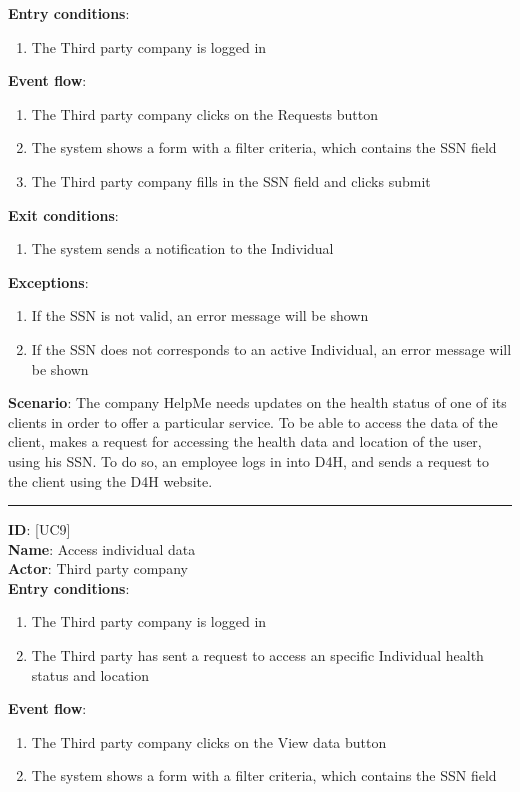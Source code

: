 \documentclass[a4paper, hidelinks, 12pt]{report}
\newcommand\usecase[1]{ [UC#1] }
\begin{document}
\begin{itemize}
		\textbf{Entry conditions}:
		\begin{enumerate}
			\item{The Third party company is logged in}
		\end{enumerate}
		\textbf{Event flow}:
		\begin{enumerate}
			\item{The Third party company clicks on the Requests button}
			\item{The system shows a form with a filter criteria, which contains the SSN field}
			\item{The Third party company fills in the SSN field and clicks submit}
		\end{enumerate}
		\textbf{Exit conditions}:
		\begin{enumerate}
			\item{The system sends a notification to the Individual}
		\end{enumerate}
		\textbf{Exceptions}:
		\begin{enumerate}
			\item{If the SSN is not valid, an error message will be shown}
			\item{If the SSN does not corresponds to an active Individual, an error message will be shown}
		\end{enumerate}
		\textbf{Scenario}: The company HelpMe needs updates on the health status of one of its clients in order to offer a particular service. To be able to access the data of the client, makes a request for accessing the health data and location of the user, using his SSN. To do so, an employee logs in into D4H, and sends a request to the client using the D4H website.\\
		\rule{\linewidth}{0.4pt}
		\textbf{ID}: \usecase{9} \\
		\textbf{Name}: Access individual data \\
		\textbf{Actor}: Third party company \\
		\textbf{Entry conditions}:
		\begin{enumerate}
			\item{The Third party company is logged in}
			\item{The Third party has sent a request to access an specific Individual health status and location}
		\end{enumerate}
		\textbf{Event flow}:
		\begin{enumerate}
			\item{The Third party company clicks on the View data button}
			\item{The system shows a form with a filter criteria, which contains the SSN field}

\end{enumerate}
\end{itemize}
\end{document}
